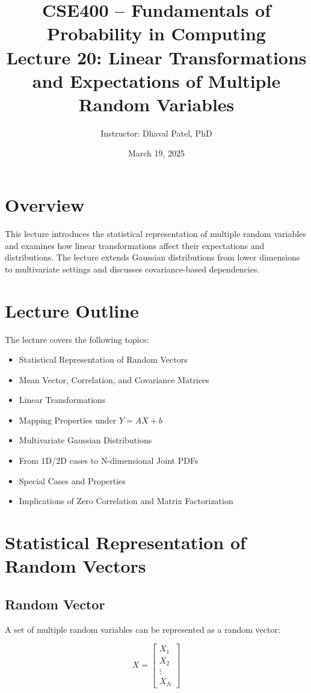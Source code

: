 \documentclass[11pt]{article}
\title{CSE400 -- Fundamentals of Probability in Computing\\
Lecture 20: Linear Transformations and Expectations of Multiple Random Variables}
\author{Instructor: Dhaval Patel, PhD}
\date{March 19, 2025}
\begin{document}
\maketitle

\section{Overview}

This lecture introduces the statistical representation of multiple random variables and examines how linear transformations affect their expectations and distributions. The lecture extends Gaussian distributions from lower dimensions to multivariate settings and discusses covariance-based dependencies.

\section{Lecture Outline}

The lecture covers the following topics:

\begin{itemize}
\item Statistical Representation of Random Vectors
\item Mean Vector, Correlation, and Covariance Matrices
\item Linear Transformations
\item Mapping Properties under $Y = AX + b$
\item Multivariate Gaussian Distributions
\item From 1D/2D cases to N-dimensional Joint PDFs
\item Special Cases and Properties
\item Implications of Zero Correlation and Matrix Factorization
\end{itemize}

\section{Statistical Representation of Random Vectors}

\subsection{Random Vector}

A set of multiple random variables can be represented as a random vector:

\[
X =
\begin{bmatrix}
X_1 \\
X_2 \\
\vdots \\
X_N
\end{bmatrix}
\]
\end{document}
